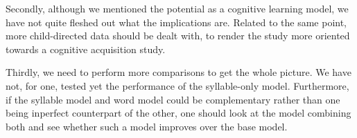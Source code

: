 \documentclass{article}
\begin{document}
Secondly, although we mentioned the potential as a cognitive learning model, we have not quite fleshed out what the implications are. Related to the same point, more child-directed data should be dealt with, to render the study more oriented towards a cognitive acquisition study.

Thirdly, we need to perform more comparisons to get the whole picture. We have not, for one, tested yet the performance of the syllable-only model. Furthermore, if the syllable model and word model could be complementary rather than one being inperfect counterpart of the other, one should look at the model combining both and see whether such a model improves over the base model.




%

\end{document}
